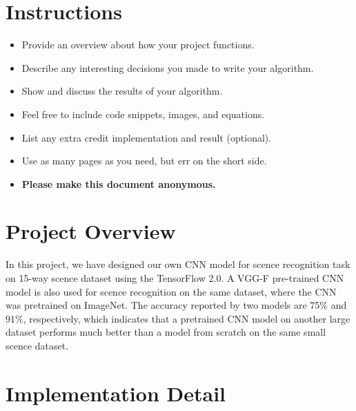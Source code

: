 \section*{Instructions}
\begin{itemize}
    \item Provide an overview about how your project functions.
    \item Describe any interesting decisions you made to write your algorithm.
    \item Show and discuss the results of your algorithm.
    \item Feel free to include code snippets, images, and equations.
    \item List any extra credit implementation and result (optional).
    \item Use as many pages as you need, but err on the short side.
    \item \textbf{Please make this document anonymous.}
\end{itemize}

\section*{Project Overview}

In this project, we have designed our own CNN model for scence recognition task on 15-way scence dataset using the TensorFlow 2.0. A VGG-F pre-trained CNN model is also used for scence recognition on the same dataset, where the CNN was pretrained on ImageNet. The accuracy reported by two models are 75\% and 91\%, respectively, which indicates that a pretrained CNN model on another large dataset performs much better than a model from scratch on the same small scence dataset.

\section*{Implementation Detail}


